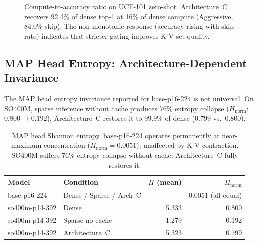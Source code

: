 \documentclass{article}
\begin{document}
\begin{figure}[htbp]
\centering
{}
\caption{Compute-to-accuracy ratio on UCF-101 zero-shot. Architecture~C
recovers 92.4\% of dense top-1 at 16\% of dense compute (Aggressive,
84.0\% skip). The non-monotonic response (accuracy rising with skip rate)
indicates that stricter gating improves K-V set quality.}
\label{fig:compute-accuracy-ratio}
\end{figure}

\subsection{MAP Head Entropy: Architecture-Dependent Invariance}
\label{sec:map-entropy}

The MAP head entropy invariance reported for base-p16-224 is not
universal. On SO400M, sparse inference without cache produces 76\%
entropy collapse ($H_{\text{norm}}$: $0.800 \to 0.192$); Architecture~C
restores it to 99.9\% of dense ($0.799$ vs.\ $0.800$).

\begin{table}[htbp]
\centering
\setlength{\tabcolsep}{5pt}
\renewcommand{\arraystretch}{1.12}
\begin{tabular}{llrr}
\toprule
\textbf{Model} & \textbf{Condition} & \textbf{$H$ (mean)} & \textbf{$H_{\text{norm}}$} \\
\midrule
base-p16-224   & Dense / Sparse / Arch~C & --- & 0.0051 (all equal) \\
\midrule
so400m-p14-392 & Dense              & 5.333 & 0.800  \\
so400m-p14-392 & Sparse-no-cache    & 1.279 & 0.192  \\
so400m-p14-392 & Architecture~C     & 5.323 & 0.799  \\
\bottomrule
\end{tabular}
\caption{MAP head Shannon entropy. base-p16-224 operates permanently at
near-maximum concentration ($H_{\text{norm}} = 0.0051$), unaffected by
K-V contraction. SO400M suffers 76\% entropy collapse without cache;
Architecture~C fully restores it.}
\label{tab:map-entropy}
\end{table}
\end{document}
